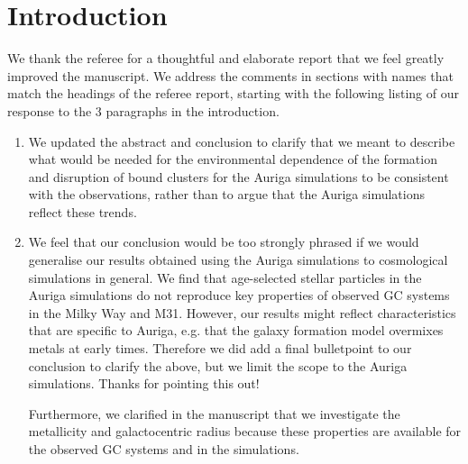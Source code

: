 \documentclass{article}
\begin{document}
\section*{Introduction}
We thank the referee for a thoughtful and elaborate report that we feel greatly
improved the manuscript. We address the comments in sections with names that match
the headings of the referee report, starting with the following listing of our 
response to the 3 paragraphs in the introduction.
\begin{enumerate}
\item We updated the abstract and conclusion to clarify that we meant to describe
what would be needed for the environmental dependence of the formation and disruption
of bound clusters for the Auriga simulations to be consistent with the observations,
rather than to argue that the Auriga simulations reflect these trends.
\item
We feel that our conclusion would be too strongly phrased if we would generalise 
our results obtained using the Auriga simulations to cosmological simulations 
in general. We find that age-selected stellar particles in the Auriga simulations 
do not reproduce key properties of observed GC systems in the Milky Way and M31.
However, our results might reflect characteristics that are specific to Auriga, 
e.g. that the galaxy formation model overmixes metals at early times. 
Therefore we did add a final bulletpoint to our conclusion to clarify the above, 
but we limit the scope to the Auriga simulations. Thanks for pointing this out!

Furthermore, we clarified in the manuscript that we investigate the metallicity
and galactocentric radius because these properties are available for the observed
GC systems and in the simulations.
\end{enumerate}
\end{document}
